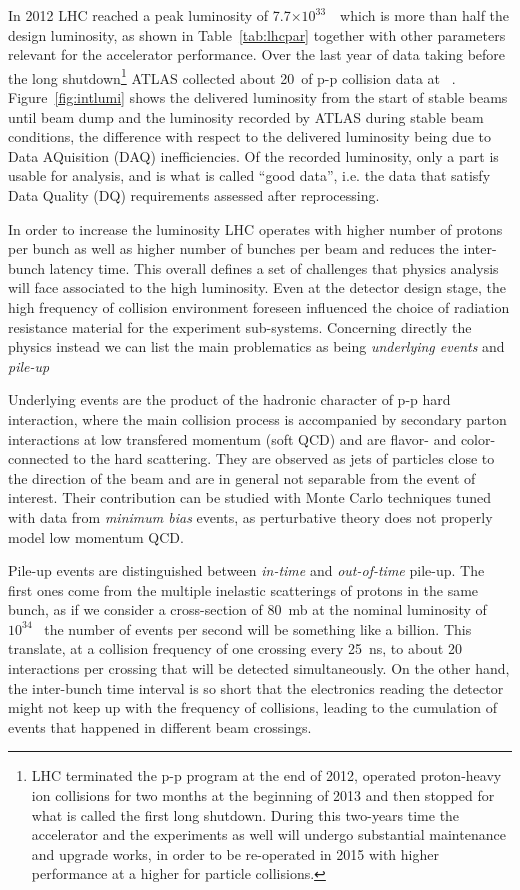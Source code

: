 In 2012 LHC reached a peak luminosity of 7.7$\times10^{33}$~\ which is
more than half the design luminosity, as shown in Table~\ref{tab:lhcpar} together
with other parameters relevant for the accelerator performance. Over the last
year of data taking before the long shutdown\footnote{LHC terminated the p-p program
at the end of 2012, operated proton-heavy ion collisions for two months at the beginning
of 2013 and then stopped for what is called the first long shutdown. During this two-years
time the accelerator and the experiments as well will undergo substantial maintenance and 
upgrade works, in order to be re-operated in 2015 with higher performance at a higher
\cme for particle collisions.}
ATLAS collected about 20\ifb\ of p-p collision data at ~\tev.
Figure~\ref{fig:intlumi} shows the delivered luminosity from the start of stable beams until beam dump and the luminosity recorded by
ATLAS during stable beam conditions, the difference with respect to the delivered luminosity being due to Data AQuisition (DAQ)
inefficiencies. Of the recorded luminosity, only a part is usable for analysis, and is what is called ``good data'', i.e. 
the data that satisfy Data Quality (DQ) requirements assessed after reprocessing.

In order to increase the luminosity LHC operates with higher number of protons per bunch as well as higher
 number of bunches per beam and reduces the inter-bunch latency time.
This overall defines a set of challenges that physics analysis will face associated to the high luminosity.
Even at the detector design stage, the high frequency of collision environment foreseen influenced
the choice of radiation resistance material for the experiment sub-systems. Concerning directly the physics
instead we can list the main problematics as being \textit{underlying events} and \textit{pile-up}

Underlying events are the product of the hadronic character of p-p hard interaction, where the main collision process
is accompanied by secondary parton interactions at low transfered momentum (soft QCD) and are flavor- and color-connected to the
hard scattering. They are observed as jets of particles close to the direction of the beam and are in general not 
separable from the event of interest. Their contribution can be studied with Monte Carlo techniques tuned with data from 
\textit{minimum bias} events, as perturbative theory does not properly model low momentum QCD.


Pile-up events are distinguished between \textit{in-time} and \textit{out-of-time} pile-up. The first ones come 
from the multiple inelastic scatterings of protons in the same bunch, as if we consider a cross-section of 80~mb
at the nominal luminosity of $10^{34}$~ the number of events per second will be something like
a billion. This translate, at a collision frequency of one crossing every 25~ns, to about 20 interactions per
crossing that will be detected simultaneously. On the other hand, the inter-bunch time interval is so short
that the electronics reading the detector might not keep up with the frequency of collisions, leading to the
cumulation of events that happened in different beam crossings.

